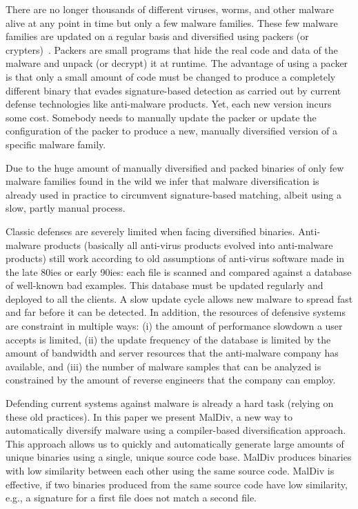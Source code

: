 \documentclass[10pt, preprint]{sigplanconf}
\begin{document}
There are no longer thousands of different viruses, worms, and other malware
alive at any point in time but only a few malware families. These few malware
families are updated on a regular basis and diversified using packers
(or crypters)~\cite{kang07worm, martignoni07acsac, oberheide09woot,
royal06acsac, perdisci08patternrec}. Packers are small programs that hide the
real code and data of the malware and unpack (or decrypt) it at runtime. The
advantage of using a packer is that only a small amount of code must be changed
to produce a completely different binary that evades signature-based detection
as carried out by current defense technologies like anti-malware products. Yet,
each new version incurs some cost. Somebody needs to manually update the packer
or update the configuration of the packer to produce a new, manually
diversified version of a specific malware family.

Due to the huge amount of manually diversified and packed binaries of only few
malware families found in the wild we infer that malware diversification
is already used in practice to circumvent signature-based matching, albeit
using a slow, partly manual process.

Classic defenses are severely limited when facing diversified binaries.
Anti-malware products (basically all anti-virus products evolved into
anti-malware products) still work according to old assumptions of anti-virus
software made in the late 80ies or early 90ies: each file is scanned and
compared against a database of well-known bad examples. This database must be
updated regularly and deployed to all the clients. A slow update cycle
allows new malware to spread fast and far before it can be detected. In
addition, the resources of defensive systems are constraint in multiple ways:
(i) the amount of performance slowdown a user accepts is limited, (ii) the
update frequency of the database is limited by the amount of bandwidth and
server resources that the anti-malware company has available, and (iii) the
number of malware samples that can be analyzed is constrained by the amount of
reverse engineers that the company can employ.

Defending current systems against malware is already a hard task (relying on
these old practices). In this paper we present MalDiv, a new way to
automatically diversify malware using a compiler-based diversification
approach. This approach allows us to quickly and automatically generate large
amounts of unique binaries using a single, unique source code base. MalDiv
produces binaries with low similarity between each other using the same source
code. MalDiv is effective, if two binaries produced from the same source code
have low similarity, e.g., a signature for a first file does not match a second
file.
\end{document}
